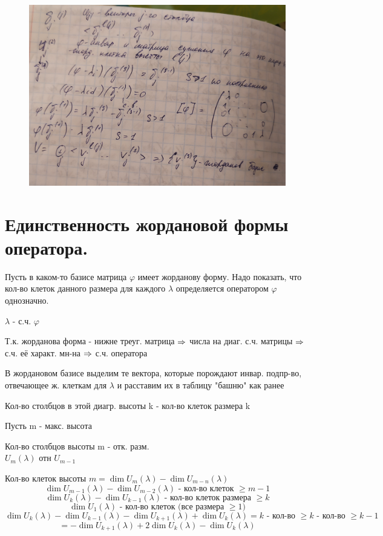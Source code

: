 \documentclass[algebra]{subfiles}
\begin{document}
    \begin{figure}[H]
            \includegraphics[width=13cm]{pics/60_2}
            \centering
    \end{figure}

    \section{Единственность жордановой формы оператора.}

    Пусть в каком-то базисе матрица $\varphi$ имеет жорданову форму. Надо показать, что кол-во клеток данного размера для каждого $\lambda$ определяется оператором $\varphi$ однозначно.

    $\lambda$ - с.ч. $\varphi$

    Т.к. жорданова форма - нижне треуг. матрица $\Rightarrow$ числа на диаг. с.ч. матрицы $\Rightarrow$ с.ч. её характ. мн-на $\Rightarrow$ с.ч. оператора

    В жордановом базисе выделим те вектора, которые порождают инвар. подпр-во, отвечающее ж. клеткам для $\lambda$ и расставим их в таблицу "башню"{} как ранее

    Кол-во столбцов в этой диагр. высоты k - кол-во клеток размера k

    Пусть m - макс. высота

    Кол-во столбцов высоты m - отк. разм.\\
    $U_m(\lambda)$ отн $U_{m-1}$

    Кол-во клеток высоты $m = \dim U_m(\lambda) - \dim U_{m-n}(\lambda)$
    \[\dim U_{m-1}(\lambda) - \dim U_{m-2}(\lambda) \text{ - кол-во клеток $\geq m-1$}\]
    \[\dim U_k (\lambda) - \dim U_{k-1}(\lambda) \text{ - кол-во клеток размера $\geq k$}\]
    \[\dim U_1(\lambda) \text{ - кол-во клеток (все размера $\geq 1$)}\]
    \[\dim U_k(\lambda) - \dim U_{k-1}(\lambda) - \dim U_{k+1}(\lambda) + \dim U_k(\lambda) = k \text{ - кол-во $\geq k$ - кол-во $\geq k-1$}\]
    \[= - \dim U_{k+1}(\lambda) + 2\dim U_k(\lambda) - \dim U_k(\lambda)\]
\end{document}
